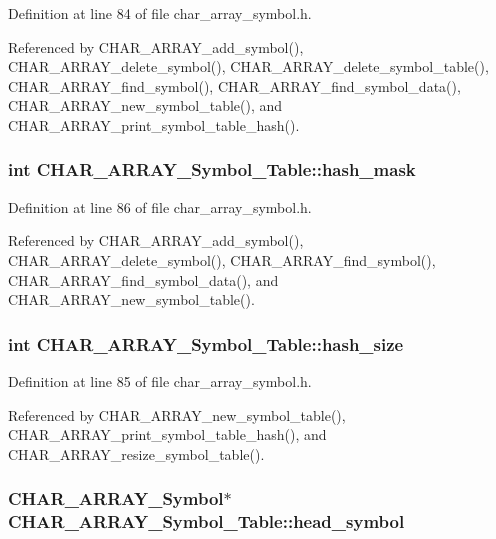 Definition at line 84 of file char\_\-array\_\-symbol.h.

Referenced by CHAR\_\-ARRAY\_\-add\_\-symbol(), CHAR\_\-ARRAY\_\-delete\_\-symbol(), CHAR\_\-ARRAY\_\-delete\_\-symbol\_\-table(), CHAR\_\-ARRAY\_\-find\_\-symbol(), CHAR\_\-ARRAY\_\-find\_\-symbol\_\-data(), CHAR\_\-ARRAY\_\-new\_\-symbol\_\-table(), and CHAR\_\-ARRAY\_\-print\_\-symbol\_\-table\_\-hash().
\subsubsection{\setlength{\rightskip}{0pt plus 5cm}int \bf{CHAR\_\-ARRAY\_\-Symbol\_\-Table::hash\_\-mask}}\label{structCHAR__ARRAY__Symbol__Table_e24ec4aa5ca0d9df9b69f892079211d7}




Definition at line 86 of file char\_\-array\_\-symbol.h.

Referenced by CHAR\_\-ARRAY\_\-add\_\-symbol(), CHAR\_\-ARRAY\_\-delete\_\-symbol(), CHAR\_\-ARRAY\_\-find\_\-symbol(), CHAR\_\-ARRAY\_\-find\_\-symbol\_\-data(), and CHAR\_\-ARRAY\_\-new\_\-symbol\_\-table().
\subsubsection{\setlength{\rightskip}{0pt plus 5cm}int \bf{CHAR\_\-ARRAY\_\-Symbol\_\-Table::hash\_\-size}}\label{structCHAR__ARRAY__Symbol__Table_5e747ef282ffb99ccc6d803d1c795cf9}




Definition at line 85 of file char\_\-array\_\-symbol.h.

Referenced by CHAR\_\-ARRAY\_\-new\_\-symbol\_\-table(), CHAR\_\-ARRAY\_\-print\_\-symbol\_\-table\_\-hash(), and CHAR\_\-ARRAY\_\-resize\_\-symbol\_\-table().
\subsubsection{\setlength{\rightskip}{0pt plus 5cm}\bf{CHAR\_\-ARRAY\_\-Symbol}$\ast$ \bf{CHAR\_\-ARRAY\_\-Symbol\_\-Table::head\_\-symbol}}\label{structCHAR__ARRAY__Symbol__Table_b0f83d1e44d85313692605632322440d}




